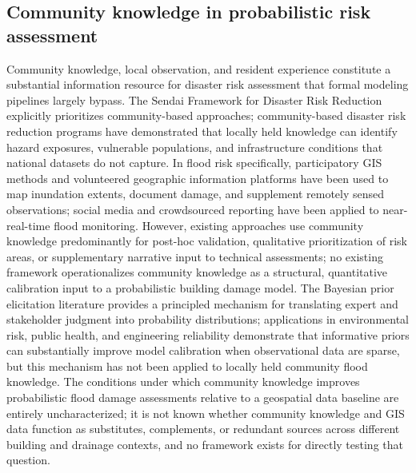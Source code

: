 \documentclass[11pt]{article}
\begin{document}
\subsection{Community knowledge in probabilistic risk assessment}
Community knowledge, local observation, and resident experience constitute a
substantial information resource for disaster risk assessment that formal modeling
pipelines largely bypass.
The Sendai Framework for Disaster Risk Reduction explicitly prioritizes
community-based approaches; community-based disaster risk reduction programs have
demonstrated that locally held knowledge can identify hazard exposures, vulnerable
populations, and infrastructure conditions that national datasets do not capture.
In flood risk specifically, participatory GIS methods and volunteered geographic
information platforms have been used to map inundation extents, document damage,
and supplement remotely sensed observations; social media and crowdsourced reporting
have been applied to near-real-time flood monitoring.
However, existing approaches use community knowledge predominantly for post-hoc
validation, qualitative prioritization of risk areas, or supplementary narrative
input to technical assessments; no existing framework operationalizes community
knowledge as a structural, quantitative calibration input to a probabilistic
building damage model.
The Bayesian prior elicitation literature provides a principled mechanism for
translating expert and stakeholder judgment into probability distributions;
applications in environmental risk, public health, and engineering reliability
demonstrate that informative priors can substantially improve model calibration
when observational data are sparse, but this mechanism has not been applied to
locally held community flood knowledge.
The conditions under which community knowledge improves probabilistic flood damage
assessments relative to a geospatial data baseline are entirely uncharacterized;
it is not known whether community knowledge and GIS data function as substitutes,
complements, or redundant sources across different building and drainage contexts,
and no framework exists for directly testing that question.
\end{document}
